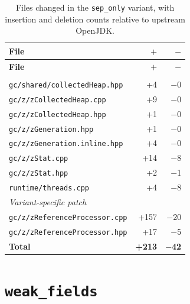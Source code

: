 \begin{longtable}[c]{lrr}
\caption[File changes in \texttt{sep\_only}]{Files changed in the \texttt{sep\_only} variant, with insertion and deletion counts relative to upstream OpenJDK.} \label{tab:patch-sep-only} \\
\toprule
\textbf{File} & \textbf{$+$} & \textbf{$-$} \\
\midrule
\endfirsthead
\toprule
\textbf{File} & \textbf{$+$} & \textbf{$-$} \\
\midrule
\endhead
\bottomrule
\endfoot
\multicolumn{3}{l}{\textit{Base patch}} \\
\texttt{gc/shared/collectedHeap.hpp}     & +4  & $-$0 \\
\texttt{gc/z/zCollectedHeap.cpp}         & +9  & $-$0 \\
\texttt{gc/z/zCollectedHeap.hpp}         & +1  & $-$0 \\
\texttt{gc/z/zGeneration.hpp}            & +1  & $-$0 \\
\texttt{gc/z/zGeneration.inline.hpp}     & +4  & $-$0 \\
\texttt{gc/z/zStat.cpp}                  & +14 & $-$8 \\
\texttt{gc/z/zStat.hpp}                  & +2  & $-$1 \\
\texttt{runtime/threads.cpp}             & +4  & $-$8 \\
\multicolumn{3}{l}{\textit{Variant-specific patch}} \\
\texttt{gc/z/zReferenceProcessor.cpp}   & +157 & $-$20 \\
\texttt{gc/z/zReferenceProcessor.hpp}   & +17  & $-$5  \\
\midrule
\textbf{Total} & \textbf{+213} & \textbf{$-$42} \\
\end{longtable}

\section{\texttt{weak\_fields}}

